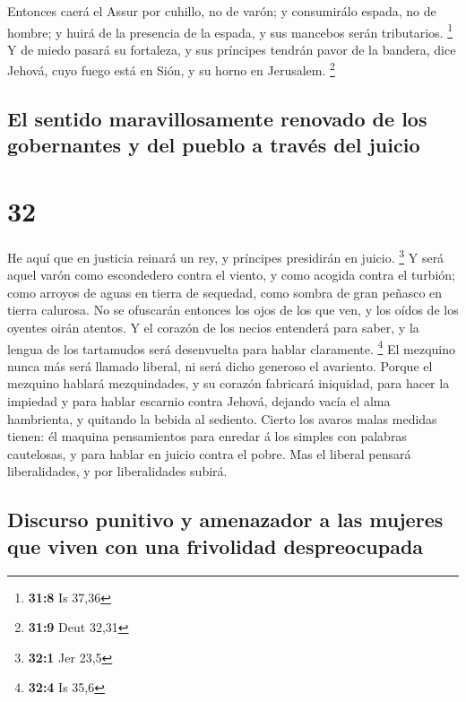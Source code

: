  Entonces caerá el Assur por cuhillo, no de varón; y
consumirálo espada, no de hombre; y huirá de la presencia de la espada,
y sus mancebos serán tributarios. \footnote{\textbf{31:8} Is 37,36}
 Y de miedo pasará su fortaleza, y sus príncipes tendrán
pavor de la bandera, dice Jehová, cuyo fuego está en Sión, y su horno en
Jerusalem. \footnote{\textbf{31:9} Deut 32,31}

\hypertarget{el-sentido-maravillosamente-renovado-de-los-gobernantes-y-del-pueblo-a-travuxe9s-del-juicio}{%
\subsection{El sentido maravillosamente renovado de los gobernantes y
del pueblo a través del
juicio}\label{el-sentido-maravillosamente-renovado-de-los-gobernantes-y-del-pueblo-a-travuxe9s-del-juicio}}

\hypertarget{section-31}{%
\section{32}\label{section-31}}

 He aquí que en justicia reinará un rey, y príncipes
presidirán en juicio. \footnote{\textbf{32:1} Jer 23,5}  Y
será aquel varón como escondedero contra el viento, y como acogida
contra el turbión; como arroyos de aguas en tierra de sequedad, como
sombra de gran peñasco en tierra calurosa.  No se ofuscarán
entonces los ojos de los que ven, y los oídos de los oyentes oirán
atentos.  Y el corazón de los necios entenderá para saber, y
la lengua de los tartamudos será desenvuelta para hablar claramente.
\footnote{\textbf{32:4} Is 35,6}  El mezquino nunca más será
llamado liberal, ni será dicho generoso el avariento. 
Porque el mezquino hablará mezquindades, y su corazón fabricará
iniquidad, para hacer la impiedad y para hablar escarnio contra Jehová,
dejando vacía el alma hambrienta, y quitando la bebida al sediento.
 Cierto los avaros malas medidas tienen: él maquina
pensamientos para enredar á los simples con palabras cautelosas, y para
hablar en juicio contra el pobre.  Mas el liberal pensará
liberalidades, y por liberalidades subirá.

\hypertarget{discurso-punitivo-y-amenazador-a-las-mujeres-que-viven-con-una-frivolidad-despreocupada}{%
\subsection{Discurso punitivo y amenazador a las mujeres que viven con
una frivolidad
despreocupada}\label{discurso-punitivo-y-amenazador-a-las-mujeres-que-viven-con-una-frivolidad-despreocupada}}

